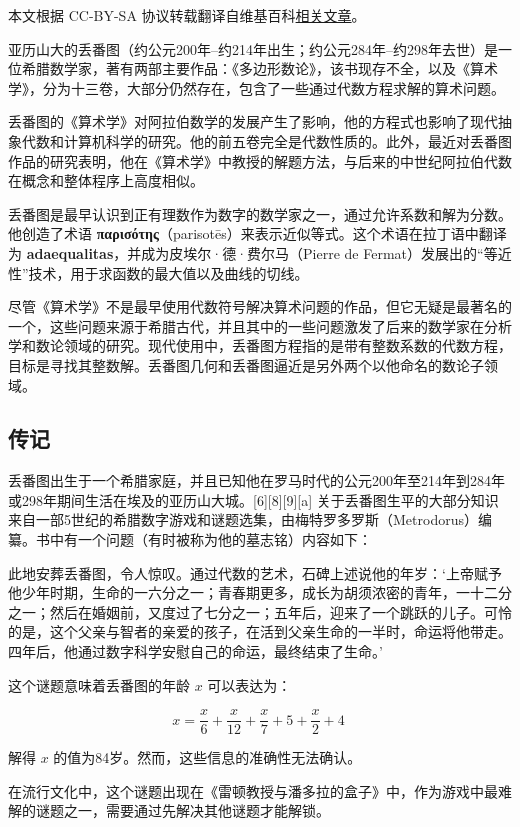 
本文根据 CC-BY-SA 协议转载翻译自维基百科\href{https://en.wikipedia.org/wiki/Diophantus#Notes}{相关文章}。

亚历山大的丢番图（约公元200年–约214年出生；约公元284年–约298年去世）是一位希腊数学家，著有两部主要作品：《多边形数论》，该书现存不全，以及《算术学》，分为十三卷，大部分仍然存在，包含了一些通过代数方程求解的算术问题。

丢番图的《算术学》对阿拉伯数学的发展产生了影响，他的方程式也影响了现代抽象代数和计算机科学的研究。他的前五卷完全是代数性质的。此外，最近对丢番图作品的研究表明，他在《算术学》中教授的解题方法，与后来的中世纪阿拉伯代数在概念和整体程序上高度相似。

丢番图是最早认识到正有理数作为数字的数学家之一，通过允许系数和解为分数。他创造了术语 \textbf{παρισότης}（parisotēs）来表示近似等式。这个术语在拉丁语中翻译为 \textbf{adaequalitas}，并成为皮埃尔·德·费尔马（Pierre de Fermat）发展出的“等近性”技术，用于求函数的最大值以及曲线的切线。

尽管《算术学》不是最早使用代数符号解决算术问题的作品，但它无疑是最著名的一个，这些问题来源于希腊古代，并且其中的一些问题激发了后来的数学家在分析学和数论领域的研究。现代使用中，丢番图方程指的是带有整数系数的代数方程，目标是寻找其整数解。丢番图几何和丢番图逼近是另外两个以他命名的数论子领域。
\subsection{传记}
丢番图出生于一个希腊家庭，并且已知他在罗马时代的公元200年至214年到284年或298年期间生活在埃及的亚历山大城。[6][8][9][a] 关于丢番图生平的大部分知识来自一部5世纪的希腊数字游戏和谜题选集，由梅特罗多罗斯（Metrodorus）编纂。书中有一个问题（有时被称为他的墓志铭）内容如下：

此地安葬丢番图，令人惊叹。通过代数的艺术，石碑上述说他的年岁：‘上帝赋予他少年时期，生命的一六分之一；青春期更多，成长为胡须浓密的青年，一十二分之一；然后在婚姻前，又度过了七分之一；五年后，迎来了一个跳跃的儿子。可怜的是，这个父亲与智者的亲爱的孩子，在活到父亲生命的一半时，命运将他带走。四年后，他通过数字科学安慰自己的命运，最终结束了生命。’

这个谜题意味着丢番图的年龄 \(x\) 可以表达为：

\[
x =\frac{x}{6}+\frac{x}{12} +\frac{x}{7}+5+\frac{x}{2}+4~
\]

解得 \(x\) 的值为84岁。然而，这些信息的准确性无法确认。

在流行文化中，这个谜题出现在《雷顿教授与潘多拉的盒子》中，作为游戏中最难解的谜题之一，需要通过先解决其他谜题才能解锁。

